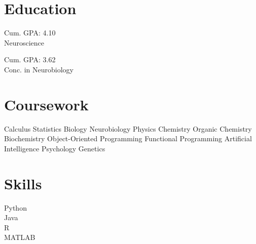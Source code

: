 \documentclass[letterpaper]{deedy-resume} %
\begin{document}
\begin{minipage}[t]{0.33\textwidth} %


\section{Education}

Cum. GPA: 4.10 \\
Neuroscience \\

\sectionspace %


Cum. GPA: 3.62 \\
Conc. in Neurobiology

\sectionspace %


\section{Coursework}

Calculus \textbullet{} Statistics \textbullet{} Biology \textbullet{} Neurobiology \textbullet{} Physics \textbullet{} Chemistry \textbullet{} Organic Chemistry \textbullet{} Biochemistry \textbullet{} Object-Oriented Programming \textbullet{} Functional Programming \textbullet{} Artificial Intelligence \textbullet{} Psychology \textbullet{} Genetics

\sectionspace %


\section{Skills}



\textbullet{} Python \\
\textbullet{} Java \\
\textbullet{} R \\
\textbullet{} MATLAB


\end{minipage}
\end{document}
